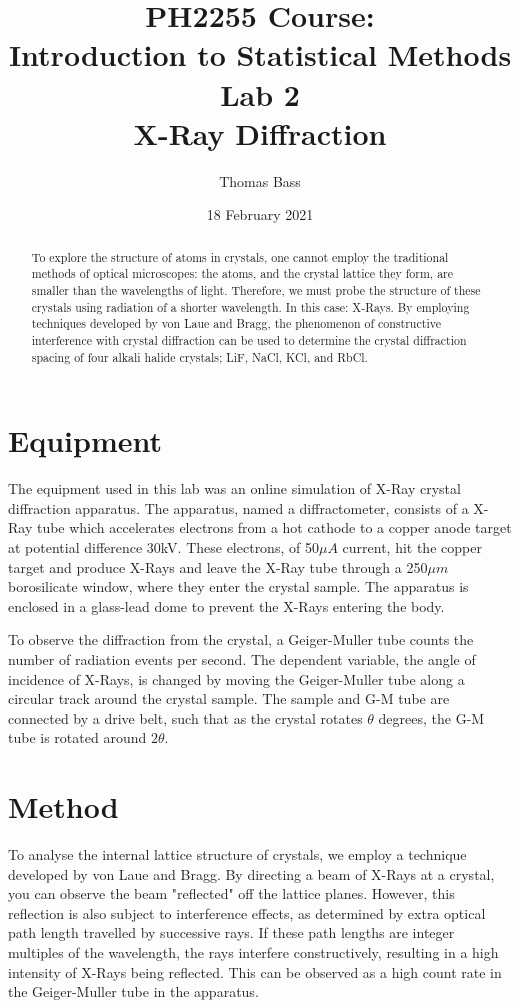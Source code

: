 \documentclass[a4paper]{article}
\title{PH2255 Course:\\
Introduction to Statistical Methods\\Lab 2\\X-Ray Diffraction}
\author{Thomas Bass}
\date{18 February 2021}
\begin{document}
\maketitle

\begin{abstract}
To explore the structure of atoms in crystals, one cannot employ the traditional methods of optical microscopes: the atoms, and the crystal lattice they form, are smaller than the wavelengths of light. Therefore, we must probe the structure of these crystals using radiation of a shorter wavelength. In this case: X-Rays. By employing techniques developed by von Laue and Bragg, the phenomenon of constructive interference with crystal diffraction can be used to determine the crystal diffraction spacing of four alkali halide crystals; LiF, NaCl, KCl, and RbCl.
\end{abstract}

\section{Equipment}

The equipment used in this lab was an online simulation of X-Ray crystal diffraction apparatus. The apparatus, named a diffractometer, consists of a X-Ray tube which accelerates electrons from a hot cathode to a copper anode target at potential difference 30kV. These electrons, of 50$\mu A$ current, hit the copper target and produce X-Rays and leave the X-Ray tube through a 250$\mu m$ borosilicate window, where they enter the crystal sample. The apparatus is enclosed in a glass-lead dome to prevent the X-Rays entering the body.

To observe the diffraction from the crystal, a Geiger-Muller tube counts the number of radiation events per second. The dependent variable, the angle of incidence of X-Rays, is changed by moving the Geiger-Muller tube along a circular track around the crystal sample. The sample and G-M tube are connected by a drive belt, such that as the crystal rotates $\theta$ degrees, the G-M tube is rotated around $2\theta$.

\section{Method}

To analyse the internal lattice structure of crystals, we employ a technique developed by von Laue and Bragg. By directing a beam of X-Rays at a crystal, you can observe the beam "reflected" off the lattice planes. However, this reflection is also subject to interference effects, as determined by extra optical path length travelled by successive rays. If these path lengths are integer multiples of the wavelength, the rays interfere constructively, resulting in a high intensity of X-Rays being reflected. This can be observed as a high count rate in the Geiger-Muller tube in the apparatus. 
\end{document}
